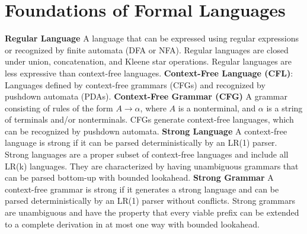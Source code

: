 

\section{Foundations of Formal Languages}
\textbf{Regular Language} A language that can be expressed using regular expressions or recognized by finite automata (DFA or NFA). Regular languages are closed under union, concatenation, and Kleene star operations.  Regular languages are less expressive than context-free languages.
\textbf{Context-Free Language (CFL)}: Languages defined by context-free grammars (CFGs) and recognized by pushdown automata (PDAs).
\textbf{Context-Free Grammar (CFG)} A grammar consisting of rules of the form $A \rightarrow \alpha $, where $A$ is a nonterminal, and $\alpha $ is a string of terminals and/or nonterminals. CFGs generate context-free languages, which can be recognized by pushdown automata.
\textbf{Strong Language} A context-free language is strong if it can be parsed deterministically by an LR(1) parser. Strong languages are a proper subset of context-free languages and include all LR(k) languages. They are characterized by having unambiguous grammars that can be parsed bottom-up with bounded lookahead.
\textbf{Strong Grammar} A context-free grammar is strong if it generates a strong language and can be parsed deterministically by an LR(1) parser without conflicts. Strong grammars are unambiguous and have the property that every viable prefix can be extended to a complete derivation in at most one way with bounded lookahead.

